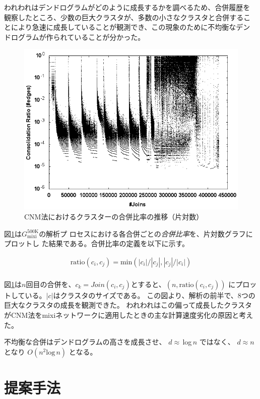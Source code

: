 \documentclass [a4j,11pt] {jsarticle}
\begin{document}
われわれはデンドログラムがどのように成長するかを調べるため、合併履歴を
観察したところ、少数の巨大クラスタが、多数の小さなクラスタと合併するこ
とにより急速に成長していることが観測でき、この現象のために不均衡なデン
ドログラムが作られていることが分かった。

\begin {figure}[htbp]
  \centerline {\includegraphics [width=0.80\linewidth]{fig3-cnm-ratio-join.png}}
  \caption {CNM法におけるクラスターの合併比率の推移（片対数）}
  \label {fig: clauset ratio}
\end{figure}

図\ref {fig: clauset ratio}は$G_{\text {mixi}}^{\text {500K}}$の解析プ
ロセスにおける各合併ごとの\emph {合併比率}を、片対数グラフにプロットし
た結果である。合併比率の定義を以下に示す。

\begin {align*}
  \text{ratio}(c_i,c_j) = \text{min}(|c_i|/|c_j|,|c_j|/|c_i|) \\
\end {align*}

図\ref{fig: clauset ratio}は$n$回目の合併を、$c_k=Join(c_i,c_j)$とすると、$(n,\text{ratio}(c_i,c_j))$
にプロットしている。$|c|$はクラスタのサイズである。
この図より、解析の前半で、8つの巨大なクラスタの成長を観測できた。
われわれはこの偏って成長したクラスタがCNM法をmixiネットワークに適用したときの主な計算速度劣化の原因と考えた。


不均衡な合併はデンドログラムの高さを成長させ、
$d\approx\,$log$\,n$
ではなく、
$d\approx n$
となり
$O(n^2\text{log}\,n)$
となる。


\section {提案手法}
\label {sect: algorithm}
\end{document}

